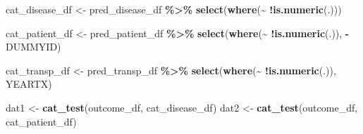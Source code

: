 \documentclass[
]{article}
\newenvironment{Shaded}{\begin{snugshade}}{\end{snugshade}}
\newcommand{\AttributeTok}[1]{\textcolor[rgb]{0.13,0.29,0.53}{#1}}
\newcommand{\FunctionTok}[1]{\textcolor[rgb]{0.13,0.29,0.53}{\textbf{#1}}}
\newcommand{\NormalTok}[1]{#1}
\newcommand{\OtherTok}[1]{\textcolor[rgb]{0.56,0.35,0.01}{#1}}
\newcommand{\SpecialCharTok}[1]{\textcolor[rgb]{0.81,0.36,0.00}{\textbf{#1}}}
\newcommand{\StringTok}[1]{\textcolor[rgb]{0.31,0.60,0.02}{#1}}
\begin{document}
\begin{Shaded}
\end{Shaded}

\begin{Shaded}
\begin{Highlighting}[]
\NormalTok{cat\_disease\_df }\OtherTok{\textless{}{-}}\NormalTok{ pred\_disease\_df }\SpecialCharTok{\%\textgreater{}\%}
  \FunctionTok{select}\NormalTok{(}\FunctionTok{where}\NormalTok{(}\SpecialCharTok{\textasciitilde{}} \SpecialCharTok{!}\FunctionTok{is.numeric}\NormalTok{(.)))}
  
\NormalTok{cat\_patient\_df }\OtherTok{\textless{}{-}}\NormalTok{ pred\_patient\_df }\SpecialCharTok{\%\textgreater{}\%}
  \FunctionTok{select}\NormalTok{(}\FunctionTok{where}\NormalTok{(}\SpecialCharTok{\textasciitilde{}} \SpecialCharTok{!}\FunctionTok{is.numeric}\NormalTok{(.)), }
         \SpecialCharTok{{-}}\NormalTok{DUMMYID)}

\NormalTok{cat\_transp\_df }\OtherTok{\textless{}{-}}\NormalTok{ pred\_transp\_df }\SpecialCharTok{\%\textgreater{}\%}
  \FunctionTok{select}\NormalTok{(}\FunctionTok{where}\NormalTok{(}\SpecialCharTok{\textasciitilde{}} \SpecialCharTok{!}\FunctionTok{is.numeric}\NormalTok{(.)),}
\NormalTok{         YEARTX)}
\end{Highlighting}
\end{Shaded}

\begin{Shaded}
\begin{Highlighting}[]
\NormalTok{dat1 }\OtherTok{\textless{}{-}} \FunctionTok{cat\_test}\NormalTok{(outcome\_df, cat\_disease\_df)}
\NormalTok{dat2 }\OtherTok{\textless{}{-}} \FunctionTok{cat\_test}\NormalTok{(outcome\_df, cat\_patient\_df)}
\end{Highlighting}
\end{Shaded}
\end{document}
